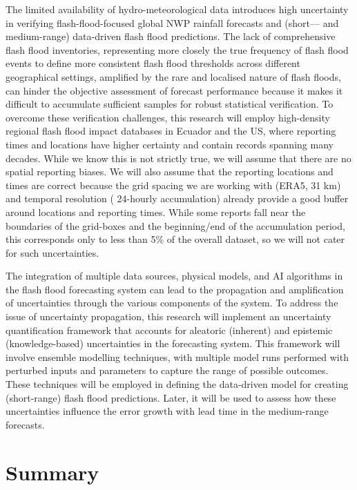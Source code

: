 The limited availability of hydro-meteorological data introduces high uncertainty in verifying flash-flood-focused global NWP rainfall forecasts and (short— and medium-range) data-driven flash flood predictions. The lack of comprehensive flash flood inventories, representing more closely the true frequency of flash flood events to define more consistent flash flood thresholds across different geographical settings, amplified by the rare and localised nature of flash floods, can hinder the objective assessment of forecast performance because it makes it difficult to accumulate sufficient samples for robust statistical verification. To overcome these verification challenges, this research will employ high-density regional flash flood impact databases in Ecuador and the US, where reporting times and locations have higher certainty and contain records spanning many decades. While we know this is not strictly true, we will assume that there are no spatial reporting biases. We will also assume that the reporting locations and times are correct because the grid spacing we are working with (ERA5, 31 km) and temporal resolution ( 24-hourly accumulation) already provide a good buffer around locations and reporting times. While some reports fall near the boundaries of the grid-boxes and the beginning/end of the accumulation period, this corresponds only to less than 5\% of the overall dataset, so we will not cater for such uncertainties. 

The integration of multiple data sources, physical models, and AI algorithms in the flash flood forecasting system can lead to the propagation and amplification of uncertainties through the various components of the system. To address the issue of uncertainty propagation, this research will implement an uncertainty quantification framework that accounts for aleatoric (inherent) and epistemic (knowledge-based) uncertainties in the forecasting system. This framework will involve ensemble modelling techniques, with multiple model runs performed with perturbed inputs and parameters to capture the range of possible outcomes. These techniques will be employed in defining the data-driven model for creating (short-range) flash flood predictions. Later, it will be used to assess how these uncertainties influence the error growth with lead time in the medium-range forecasts.


\section{Summary} 

